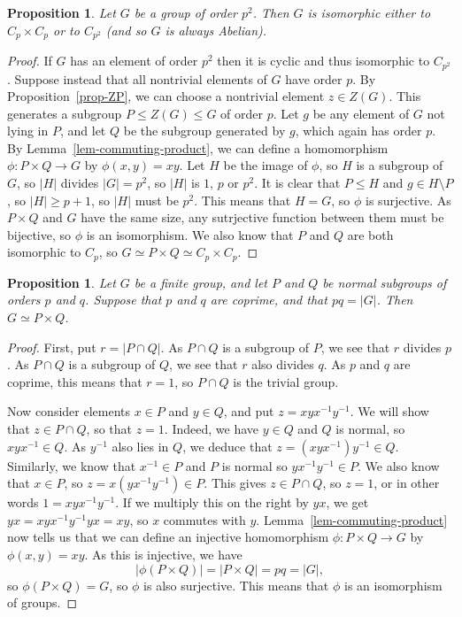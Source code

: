 \documentclass{amsart}
\newcommand{\tm}        {\times}
\newcommand{\xra}       {\xrightarrow}
\renewcommand{\:}{\colon}
\newtheorem{proposition}[theorem]{Proposition}
\theoremstyle{definition}
\begin{document}
\begin{proposition}\label{prop-p-squared}
 Let $G$ be a group of order $p^2$.  Then $G$ is isomorphic either to
 $C_p\tm C_p$ or to $C_{p^2}$ (and so $G$ is always Abelian).
\end{proposition}
\begin{proof}
 If $G$ has an element of order $p^2$ then it is cyclic and thus
 isomorphic to $C_{p^2}$.  Suppose instead that all nontrivial
 elements of $G$ have order $p$.  By Proposition~\ref{prop-ZP}, we can
 choose a nontrivial element $z\in Z(G)$.  This generates a subgroup
 $P\leq Z(G)\leq G$ of order $p$.  Let $g$ be any element of $G$ not
 lying in $P$, and let $Q$ be the subgroup generated by $g$, which
 again has order $p$.  By Lemma~\ref{lem-commuting-product}, we can
 define a homomorphism $\phi\:P\tm Q\xra{}G$ by $\phi(x,y)=xy$.  Let
 $H$ be the image of $\phi$, so $H$ is a subgroup of $G$, so $|H|$
 divides $|G|=p^2$, so $|H|$ is $1$, $p$ or $p^2$.  It is clear that
 $P\leq H$ and $g\in H\setminus P$, so $|H|\geq p+1$, so $|H|$ must be
 $p^2$.  This means that $H=G$, so $\phi$ is surjective.  As
 $P\tm Q$ and $G$ have the same size, any sutrjective function between
 them must be bijective, so $\phi$ is an isomorphism.  We also know
 that $P$ and $Q$ are both isomorphic to $C_p$, so
 $G\simeq P\tm Q\simeq C_p\tm C_p$.
\end{proof}

\begin{proposition}\label{prop-coprime}
 Let $G$ be a finite group, and let $P$ and $Q$ be \emph{normal}
 subgroups of orders $p$ and $q$.  Suppose that $p$ and $q$ are
 coprime, and that $pq=|G|$.  Then $G\simeq P\tm Q$.
\end{proposition}
\begin{proof}
 First, put $r=|P\cap Q|$.  As $P\cap Q$ is a subgroup of $P$, we see
 that $r$ divides $p$.  As $P\cap Q$ is a subgroup of $Q$, we see that
 $r$ also divides $q$.  As $p$ and $q$ are coprime, this means that
 $r=1$, so $P\cap Q$ is the trivial group.

 Now consider elements $x\in P$ and $y\in Q$, and put
 $z=xyx^{-1}y^{-1}$.  We will show that $z\in P\cap Q$, so that
 $z=1$.  Indeed, we have $y\in Q$ and $Q$ is normal, so
 $xyx^{-1}\in Q$.  As $y^{-1}$ also lies in $Q$, we deduce that
 $z=(xyx^{-1})y^{-1}\in Q$.  Similarly, we know that $x^{-1}\in P$ and
 $P$ is normal so $yx^{-1}y^{-1}\in P$.  We also know that $x\in P$,
 so $z=x(yx^{-1}y^{-1})\in P$.  This gives $z\in P\cap Q$, so $z=1$,
 or in other words $1=xyx^{-1}y^{-1}$.  If we multiply this on the
 right by $yx$, we get $yx=xyx^{-1}y^{-1}yx=xy$, so $x$ commutes with
 $y$.  Lemma~\ref{lem-commuting-product} now tells us that we can
 define an injective homomorphism $\phi\:P\tm Q\xra{}G$ by
 $\phi(x,y)=xy$.  As this is injective, we have 
 \[ |\phi(P\tm Q)| = |P\tm Q|=pq=|G|, \]
 so $\phi(P\tm Q)=G$, so $\phi$ is also surjective.  This means that
 $\phi$ is an isomorphism of groups.
\end{proof}
\end{document}
